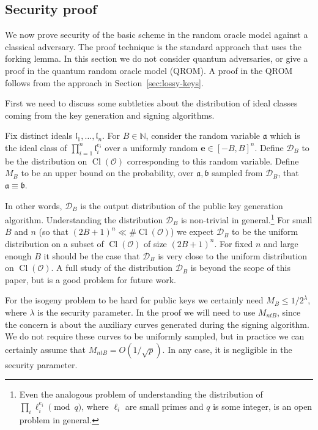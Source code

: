 \documentclass{llncs}
\newcommand{\D}{\mathcal{D}}
\newcommand{\N}{\mathbb{N}}
\newcommand{\OO}{\mathcal{O}}
\DeclareMathOperator{\Cl}{Cl}
\renewcommand{\a}{\mathfrak{a}}
\renewcommand{\b}{\mathfrak{b}}
\renewcommand{\l}{\mathfrak{l}}
\newcommand{\e}{\mathbf{e}}
\begin{document}
\subsection{Security proof}
\label{sec:security-proof}

We now prove security of the basic scheme in the random oracle model against a classical adversary. 
The proof technique is the standard approach that uses the forking lemma.
In this section we do not consider quantum adversaries, or give a proof in the quantum random oracle model (QROM).
A proof in the QROM follows from the approach in Section~\ref{sec:lossy-keys}.

First we need to discuss some subtleties about the distribution of ideal classes coming from the key generation and signing algorithms.

\begin{definition} \label{defn:sampling-distributions}
Fix distinct ideals $\l_1, \dots, \l_n$.
For $B \in \N$, consider the random variable $\a$ which is the ideal class of $\prod_{i=1}^n \l_i^{e_i}$ over a uniformly random $\e \in [-B,B]^n$.
Define $\D_B$ to be the distribution on $\Cl( \OO )$ corresponding to this random variable.
%
Define $M_B$ to be an upper bound on the probability, over $\a, \b$ sampled from $\D_B$, that $\a \equiv \b$.
\end{definition}

In other words, $\D_B$ is the output distribution of the public key generation algorithm.
Understanding the distribution $\D_B$ is non-trivial in general.\footnote{Even the analogous problem of understanding the distribution of $\prod_i \ell_i^{e_i} \pmod{q}$, where $\ell_i$ are small primes and $q$ is some integer, is an open problem in general.}
For small $B$ and $n$ (so that $(2B+1)^n \ll \#\Cl(\OO)$) we expect $\D_B$ to be the uniform distribution on a subset of $\Cl(\OO)$ of size $(2B+1)^n$. For fixed $n$ and large enough $B$ it should be the case that $\D_B$ is very close to the uniform distribution on $\Cl(\OO)$.
A full study of the distribution $\D_B$ is beyond the scope of this paper, but is a good problem for future work.

For the isogeny problem to be hard for public keys we certainly need $M_B \le 1/2^\lambda$, where $\lambda$ is the security parameter.
In the proof we will need to use $M_{ntB}$, since the concern is about the auxiliary curves generated during the signing algorithm. We do not require these curves to be uniformly sampled, but in practice we can certainly assume that $M_{ntB} = O( 1/\sqrt{p} )$. In any case, it is negligible in the security parameter.
\end{document}
